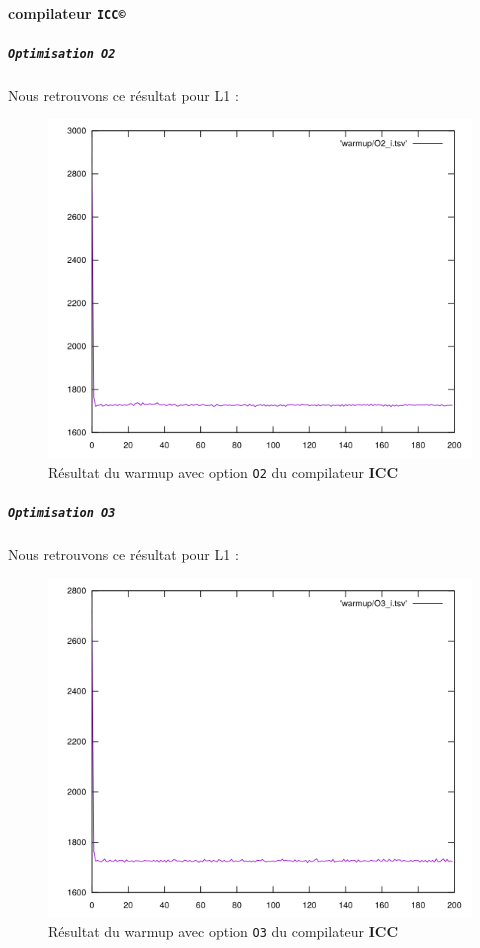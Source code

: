 \documentclass{report}
\begin{document}
\paragraph{compilateur \texttt{ICC©}}
    \subparagraph{ \texttt{Optimisation O2}}
  Nous retrouvons ce résultat pour L1 :
  \begin{figure}[ht!]
    \centering
\includegraphics[scale=0.45]{resources/warmup/L1/O2_i.png}
    \caption{Résultat du warmup avec option \texttt{O2} du compilateur \textbf{ICC}}
  \end{figure}
  \newpage
\subparagraph{ \texttt{Optimisation O3}}
Nous retrouvons ce résultat pour L1 :
\begin{figure}[ht!]
  \centering
  \includegraphics[scale=0.45]{resources/warmup/L1/O3_i.png}
  \caption{Résultat du warmup avec option \texttt{O3} du compilateur \textbf{ICC}}
\end{figure}
\end{document}
